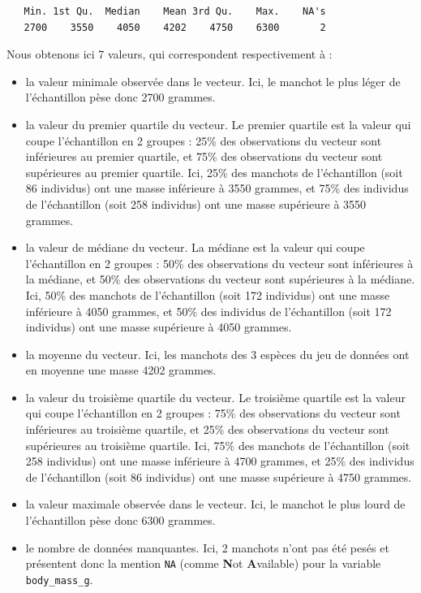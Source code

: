 \documentclass[
  a4paper,
  DIV=11,
  numbers=noendperiod,
  oneside]{scrreprt}
\providecommand{\tightlist}{%
  \setlength{\itemsep}{0pt}\setlength{\parskip}{0pt}}\usepackage{longtable,booktabs,array}
\begin{document}
\begin{verbatim}
   Min. 1st Qu.  Median    Mean 3rd Qu.    Max.    NA's 
   2700    3550    4050    4202    4750    6300       2 
\end{verbatim}

Nous obtenons ici 7 valeurs, qui correspondent respectivement à :

\begin{itemize}
\tightlist
\item
  la valeur minimale observée dans le vecteur. Ici, le manchot le plus
  léger de l'échantillon pèse donc 2700 grammes.
\item
  la valeur du premier quartile du vecteur. Le premier quartile est la
  valeur qui coupe l'échantillon en 2 groupes : 25\% des observations du
  vecteur sont inférieures au premier quartile, et 75\% des observations
  du vecteur sont supérieures au premier quartile. Ici, 25\% des
  manchots de l'échantillon (soit 86 individus) ont une masse inférieure
  à 3550 grammes, et 75\% des individus de l'échantillon (soit 258
  individus) ont une masse supérieure à 3550 grammes.
\item
  la valeur de médiane du vecteur. La médiane est la valeur qui coupe
  l'échantillon en 2 groupes : 50\% des observations du vecteur sont
  inférieures à la médiane, et 50\% des observations du vecteur sont
  supérieures à la médiane. Ici, 50\% des manchots de l'échantillon
  (soit 172 individus) ont une masse inférieure à 4050 grammes, et 50\%
  des individus de l'échantillon (soit 172 individus) ont une masse
  supérieure à 4050 grammes.
\item
  la moyenne du vecteur. Ici, les manchots des 3 espèces du jeu de
  données ont en moyenne une masse 4202 grammes.
\item
  la valeur du troisième quartile du vecteur. Le troisième quartile est
  la valeur qui coupe l'échantillon en 2 groupes : 75\% des observations
  du vecteur sont inférieures au troisième quartile, et 25\% des
  observations du vecteur sont supérieures au troisième quartile. Ici,
  75\% des manchots de l'échantillon (soit 258 individus) ont une masse
  inférieure à 4700 grammes, et 25\% des individus de l'échantillon
  (soit 86 individus) ont une masse supérieure à 4750 grammes.
\item
  la valeur maximale observée dans le vecteur. Ici, le manchot le plus
  lourd de l'échantillon pèse donc 6300 grammes.
\item
  le nombre de données manquantes. Ici, 2 manchots n'ont pas été pesés
  et présentent donc la mention \texttt{NA} (comme \textbf{N}ot
  \textbf{A}vailable) pour la variable \texttt{body\_mass\_g}.
\end{itemize}
\end{document}

